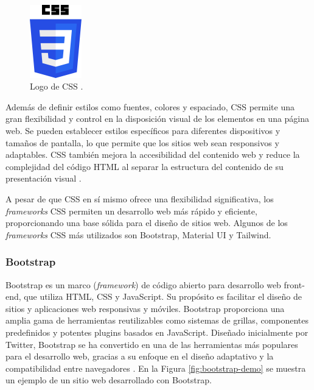 \begin{figure}[!htbp]
  \centering
  \includegraphics[width=0.2\textwidth]{imagenes/02-marco-teorico/css-logo.png}
  \caption[Logo de CSS]{Logo de CSS \cite{w3c_css_home}.}
  \label{fig:css-logo}
\end{figure}

Además de definir estilos como fuentes, colores y espaciado, CSS permite una gran
flexibilidad y control en la disposición visual de los elementos en una página web.
Se pueden establecer estilos específicos para diferentes dispositivos y tamaños de
pantalla, lo que permite que los sitios web sean responsivos y adaptables. CSS
también mejora la accesibilidad del contenido web y reduce la complejidad del
código HTML al separar la estructura del contenido de su presentación visual \cite{w3c_css_home}.

A pesar de que CSS en sí mismo ofrece una flexibilidad significativa, los
\textit{frameworks} CSS permiten un desarrollo web más rápido y eficiente,
proporcionando una base sólida para el diseño de sitios web. Algunos de los
\textit{frameworks} CSS más utilizados son Bootstrap, Material UI y Tailwind.

\subsubsection{Bootstrap}
Bootstrap es un marco (\textit{framework}) de código abierto para desarrollo web
front-end, que utiliza HTML, CSS y JavaScript. Su propósito es facilitar el
diseño de sitios y aplicaciones web responsivas y móviles. Bootstrap proporciona
una amplia gama de herramientas reutilizables como sistemas de grillas,
componentes predefinidos y potentes plugins basados en JavaScript. Diseñado
inicialmente por Twitter, Bootstrap se ha convertido en una de las herramientas
más populares para el desarrollo web, gracias a su enfoque en el diseño adaptativo
y la compatibilidad entre navegadores \cite{bootstrap_official}. En la Figura
\ref{fig:bootstrap-demo} se muestra un ejemplo de un sitio web desarrollado con
Bootstrap.

